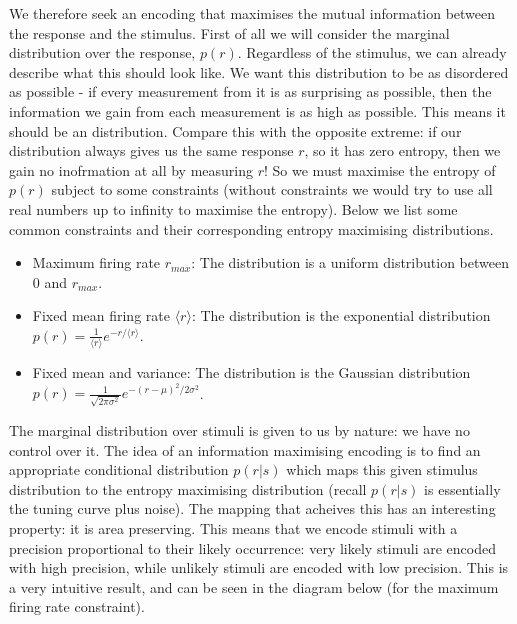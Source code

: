 \documentclass{article}
\begin{document}
We therefore seek an encoding that maximises the mutual information between the response and the stimulus. First of all we will consider the marginal distribution over the response, $p(r)$. Regardless of the stimulus, we can already describe what this should look like. We want this distribution to be as disordered as possible - if every measurement from it is as surprising as possible, then the information we gain from each measurement is as high as possible. This means it should be an  distribution. Compare this with the opposite extreme: if our distribution always gives us the same response $r$, so it has zero entropy, then we gain no inofrmation at all by measuring $r$! So we must maximise the entropy of $p(r)$ subject to some constraints (without constraints we would try to use all real numbers up to infinity to maximise the entropy). Below we list some common constraints and their corresponding entropy maximising distributions.

\begin{itemize}
    \item Maximum firing rate $r_{max}$: The distribution is a uniform distribution between 0 and $r_{max}$.
    \item Fixed mean firing rate $\langle r \rangle$: The distribution is the exponential distribution $p(r) = \frac{1}{\langle r \rangle}e^{-r/\langle r \rangle}$.
    \item Fixed mean and variance: The distribution is the Gaussian distribution $p(r) = \frac{1}{\sqrt{2\pi\sigma^2}}e^{-(r-\mu)^2/2\sigma^2}$.
\end{itemize}

The marginal distribution over stimuli is given to us by nature: we have no control over it. The idea of an information maximising encoding is to find an appropriate conditional distribution $p(r|s)$ which maps this given stimulus distribution to the entropy maximising distribution (recall $p(r|s)$ is essentially the tuning curve plus noise). The mapping that acheives this has an interesting property: it is area preserving. This means that we encode stimuli with a precision proportional to their likely occurrence: very likely stimuli are encoded with high precision, while unlikely stimuli are encoded with low precision. This is a very intuitive result, and can be seen in the diagram below (for the maximum firing rate constraint).
\end{document}
